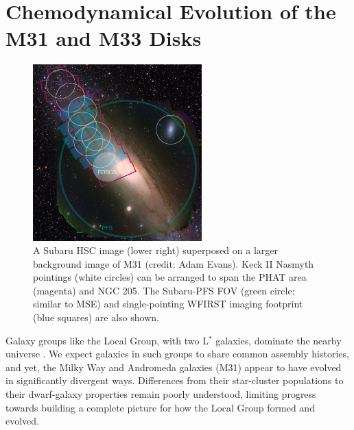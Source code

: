 \documentclass[11pt,a4paper,twoside,onecolumn,openany,final,oldfontcommands]{memoir}
\begin{document}



\section{Chemodynamical Evolution of the M31 and M33 Disks}
\label{sec:m31disk}

\begin{figure}
\begin{center}
\includegraphics[width=0.58\textwidth]{figs/M31_footprint_v3.jpg}
\end{center}
\caption[M31 pointing distribution]{A Subaru HSC image (lower right) superposed on a larger background image of M31 (credit: Adam Evans).  Keck II Nasmyth pointings (white circles) can be arranged to span the PHAT area (magenta) and NGC 205.  The Subaru-PFS FOV (green circle; similar to MSE) and single-pointing WFIRST imaging footprint (blue squares) are also shown.}
\label{fig:M31}    
\end{figure}

Galaxy groups like the Local Group, with two L$^*$ galaxies, dominate the nearby universe \citep{kourkchi17}.  We expect galaxies in such groups to share common assembly histories, and yet, the Milky Way and Andromeda galaxies (M31) appear to have evolved in significantly divergent ways.  Differences from their star-cluster populations to their dwarf-galaxy properties remain poorly understood, limiting progress towards building a complete picture for how the Local Group formed and evolved.
\end{document}
